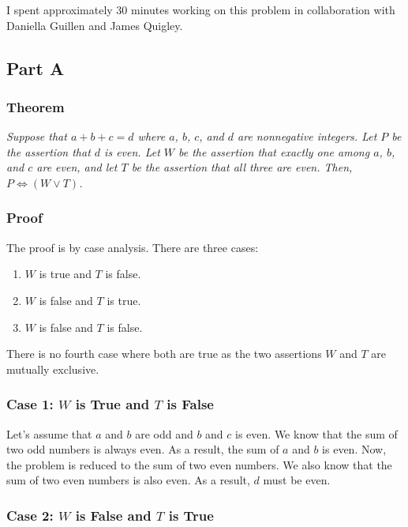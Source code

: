 \documentclass{article}
\begin{document}
I spent approximately 30 minutes working on this problem in collaboration with
Daniella Guillen and James Quigley.

\subsection*{Part A}

\subsubsection*{Theorem}

\textit{Suppose that $a + b + c = d$ where $a$, $b$, $c$, and $d$ are nonnegative
integers. Let $P$ be the assertion that $d$ is even. Let $W$ be the assertion
that exactly one among $a$, $b$, and $c$ are even, and let $T$ be the assertion
that all three are even. Then, $ P \iff (W \lor T) $.}

\subsubsection*{Proof}

The proof is by case analysis. There are three cases:

\begin{enumerate}[\hspace{1cm}1.]
  \item $W$ is true and $T$ is false.
  \item $W$ is false and $T$ is true.
  \item $W$ is false and $T$ is false.
\end{enumerate}

There is no fourth case where both are true as the two assertions $W$ and
$T$ are mutually exclusive.

\subsubsection*{Case 1: $W$ is True and $T$ is False}

Let's assume that $a$ and $b$ are odd and $b$ and $c$ is even. We know that
the sum of two odd numbers is always even. As a result, the sum of $a$ and $b$
is even. Now, the problem is reduced to the sum of two even numbers. We also
know that the sum of two even numbers is also even. As a result, $d$ must be
even.

\subsubsection*{Case 2: $W$ is False and $T$ is True}
\end{document}
